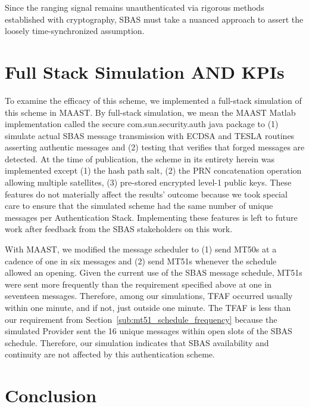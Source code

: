 \documentclass[letterpaper,times]{IONconf/IONconf}
\begin{document}
	Since the ranging signal remains unauthenticated via rigorous methods established with cryptography, SBAS must take a nuanced approach to assert the loosely time-synchronized assumption.

\section{Full Stack Simulation AND KPIs} \label{sec:full_stack_simulation}

	To examine the efficacy of this scheme, we implemented a full-stack simulation of this scheme in MAAST.
	By full-stack simulation, we mean the MAAST Matlab implementation called the secure com.sun.security.auth java package to (1) simulate actual SBAS message transmission with ECDSA and TESLA routines asserting authentic messages and (2) testing that verifies that forged messages are detected.
	At the time of publication, the scheme in its entirety herein was implemented except (1) the hash path salt, (2) the PRN concatenation operation allowing multiple satellites, (3) pre-stored encrypted level-1 public keys.
	These features do not materially affect the results' outcome because we took special care to ensure that the simulated scheme had the same number of unique messages per Authentication Stack.
	Implementing these features is left to future work after feedback from the SBAS stakeholders on this work.

	With MAAST, we modified the message scheduler to (1) send MT50s at a cadence of one in six messages and (2) send MT51s whenever the schedule allowed an opening.
	Given the current use of the SBAS message schedule, MT51s were sent more frequently than the requirement specified above at one in seventeen messages.
	Therefore, among our simulations, TFAF occurred usually within one minute, and if not, just outside one minute.
	The TFAF is less than our requirement from Section~\ref{sub:mt51_schedule_frequency} because the simulated Provider sent the 16 unique messages within open slots of the SBAS schedule.
	Therefore, our simulation indicates that SBAS availability and continuity are not affected by this authentication scheme.

\section{Conclusion} \label{sec:conclusion}
\end{document}
